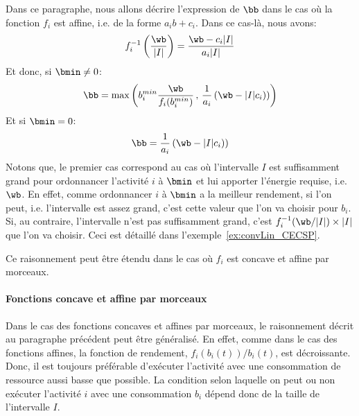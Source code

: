 Dans ce paragraphe, nous allons décrire l'expression de $\bb$ dans le
cas où la fonction $f_i$ est affine, i.e. de la forme $a_ib+c_i$. Dans
ce cas-là, nous avons:  
\[f_i^{-1}\left( \frac{\wb}{|I|}\right)= \frac{ \wb- c_i|I|}{a_i|I|}
\]
Et donc, si $\bmin\neq 0$: 
\begin{equation}
\bb= \max\left(b_i^{min} \frac{\wb}{f_i(b_i^{min})} \, ,\,  
  \frac{1}{a_i}\left(\wb-|I|c_{i})\right)\right)
\end{equation}
Et si $\bmin=0$: 
\[
\bb=  \frac{1}{a_i}\left(\wb-|I|c_{i})\right)
\]
Notons que, le premier cas correspond au cas où l'intervalle $I$ est
suffisamment grand pour ordonnancer l'activité $i$ à $\bmin$ et lui
apporter l'énergie requise, i.e. $\wb$. En effet, comme ordonnancer
$i$ à $\bmin$ a la meilleur rendement, si l'on peut, i.e. l'intervalle
est assez grand, c'est cette valeur que l'on va choisir pour
$b_i$. Si, au contraire, l'intervalle n'est pas suffisamment grand,
c'est $f_i^{-1}(\wb/|I|) \times |I|$ que l'on va choisir. Ceci est
détaillé dans l'exemple~\ref{ex:convLin_CECSP}.

\begin{ex}
\label{ex:convLin_CECSP}

\end{ex}

Ce raisonnement peut être étendu dans le cas où $f_i$ est concave et
affine par morceaux. 

\paragraph{Fonctions concave et affine par morceaux}

Dans le cas des fonctions concaves et affines par morceaux, le
raisonnement décrit au paragraphe précédent peut être généralisé. En
effet, comme dans le cas des fonctions affines, la fonction de
rendement, $f_i(b_i(t))/b_i(t)$, est décroissante. Donc, il est
toujours préférable d'exécuter l'activité avec une consommation de
ressource aussi basse que possible. La condition selon laquelle on
peut ou non exécuter l'activité $i$ avec une consommation $b_i$ dépend
donc de la taille de l'intervalle $I$. 

